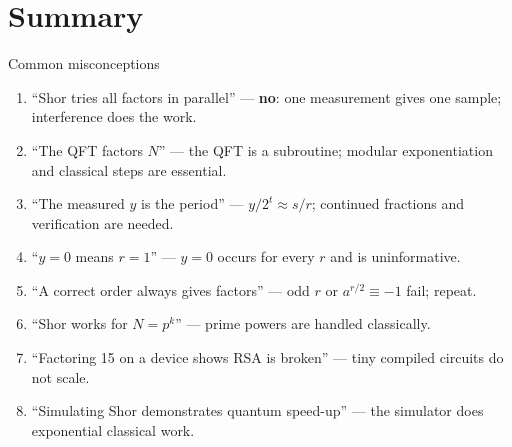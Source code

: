\documentclass[aspectratio=169,11pt]{beamer}
\newcommand{\hl}[1]{{\color{qorange}\textbf{#1}}}
\begin{document}
\section{Summary}
\begin{frame}[label=fPitfalls]{Common misconceptions}
  \small
  \begin{enumerate}\itemsep1pt
    \item ``Shor tries all factors in parallel'' --- \hl{no}: one measurement gives one sample; interference does the work.
    \item ``The QFT factors $N$'' --- the QFT is a subroutine; modular exponentiation and classical steps are essential.
    \item ``The measured $y$ is the period'' --- $y/2^t \approx s/r$; continued fractions and verification are needed.
    \item ``$y = 0$ means $r = 1$'' --- $y = 0$ occurs for every $r$ and is uninformative.
    \item ``A correct order always gives factors'' --- odd $r$ or $a^{r/2} \equiv -1$ fail; repeat.
    \item ``Shor works for $N = p^k$'' --- prime powers are handled classically.
    \item ``Factoring 15 on a device shows RSA is broken'' --- tiny compiled circuits do not scale.
    \item ``Simulating Shor demonstrates quantum speed-up'' --- the simulator does exponential classical work.
  \end{enumerate}
\end{frame}
\end{document}
